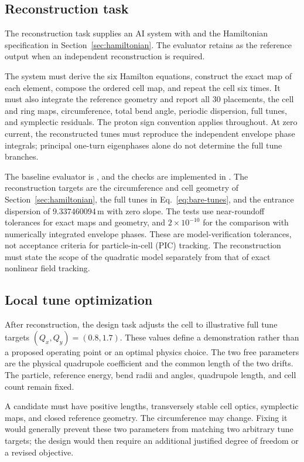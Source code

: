 \documentclass[11pt,a4paper]{article}
\numberwithin{equation}{section}
\newcommand{\units}[1]{\,\mathrm{#1}}
\begin{document}
\subsection{Reconstruction task}

The reconstruction task supplies an AI system with
 and the Hamiltonian specification in
Section~\ref{sec:hamiltonian}. The evaluator retains
 as the reference output when an independent
reconstruction is required.

The system must derive the six Hamilton equations, construct the exact
map of each element, compose the ordered cell map, and repeat the cell
six times. It must also integrate the reference geometry and report all
30 placements, the cell and ring maps, circumference, total bend angle,
periodic dispersion, full tunes, and symplectic residuals. The proton
sign convention applies throughout. At zero current, the reconstructed
tunes must reproduce the independent envelope phase integrals; principal
one-turn eigenphases alone do not determine the full tune branches.

The baseline evaluator is , and the checks are
implemented in . The reconstruction targets
are the circumference and cell geometry of Section~\ref{sec:hamiltonian},
the full tunes in Eq.~\eqref{eq:bare-tunes}, and the entrance dispersion
of $9.337460094\units{m}$ with zero slope. The tests use near-roundoff
tolerances for exact maps and geometry, and $2\times10^{-10}$ for the
comparison with numerically integrated envelope phases. These are
model-verification tolerances, not acceptance criteria for
particle-in-cell (PIC) tracking. The reconstruction must state the
scope of the quadratic model separately from that of exact nonlinear
field tracking.

\subsection{Local tune optimization}

After reconstruction, the design task adjusts the cell to illustrative
full tune targets $(Q_x,Q_y)=(0.8,1.7)$. These values define a
demonstration rather than a proposed operating point or an optimal
physics choice. The two free parameters are the physical quadrupole
coefficient and the common length of the two drifts. The particle,
reference energy, bend radii and angles, quadrupole length, and cell
count remain fixed.

A candidate must have positive lengths, transversely stable cell
optics, symplectic maps, and closed reference geometry. The circumference
may change. Fixing it would generally prevent these two parameters from
matching two arbitrary tune targets; the design would then require an
additional justified degree of freedom or a revised objective.
\end{document}
